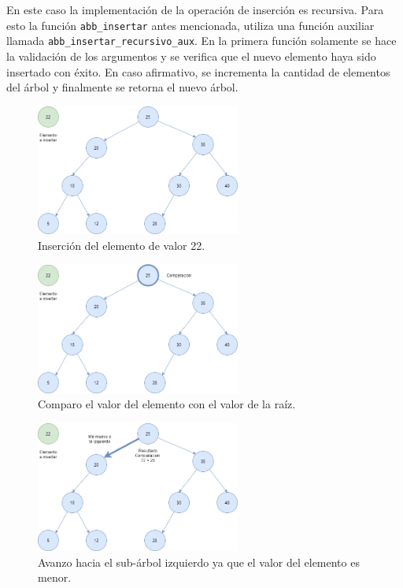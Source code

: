 \documentclass[titlepage,a4paper]{article}
\begin{document}
En este caso la implementación de la operación de inserción es recursiva. Para
esto la función \lstinline{abb_insertar} antes mencionada, utiliza una función
auxiliar llamada \lstinline{abb_insertar_recursivo_aux}. En la primera función
solamente se hace la validación de los argumentos y se verifica que el nuevo
elemento haya sido insertado con éxito. En caso afirmativo, se incrementa la
cantidad de elementos del árbol y finalmente se retorna el nuevo árbol.

\begin{figure}[H]
\centering
\includegraphics[width=0.6\textwidth]{insercion_1.png}
\caption{\label{fig:seq03}Inserción del elemento de valor 22.}
\end{figure}

\begin{figure}[H]
\centering
\includegraphics[width=0.6\textwidth]{insercion_2.png}
\caption{\label{fig:seq04}Comparo el valor del elemento con el valor de la raíz.}
\end{figure}

\begin{figure}[H]
\centering
\includegraphics[width=0.6\textwidth]{insercion_3.png}
\caption{\label{fig:seq05}Avanzo hacia el sub-árbol izquierdo ya que el valor del elemento es menor.}
\end{figure}
\end{document}
